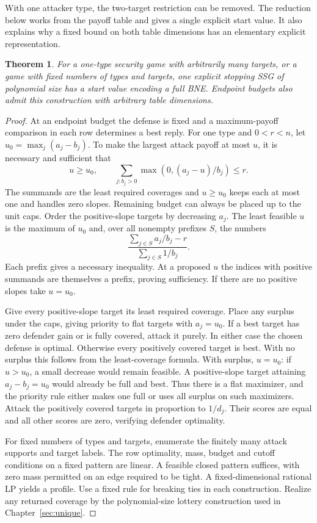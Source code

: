 \documentclass[11pt,oneside,openany,notitlepage]{report}
\newtheorem{theorem}{Theorem}[chapter]
\begin{document}
With one attacker type, the two-target restriction can be removed.
The reduction below works from the payoff table and gives a single
explicit start value. It also explains why a fixed bound on both table
dimensions has an elementary explicit representation.

\begin{theorem}\label{thm:ssgsmall}
For a one-type security game with arbitrarily many targets, or a game
with fixed numbers of types and targets, one explicit stopping SSG of
polynomial size has a start value encoding a full BNE. Endpoint budgets
also admit this construction with arbitrary table dimensions.
\end{theorem}
\begin{proof}
At an endpoint budget the defense is fixed and a maximum-payoff
comparison in each row determines a best reply. For one type and
\(0<r<n\), let \(u_0=\max_j(a_j-b_j)\). To make the largest attack
payoff at most \(u\), it is necessary and sufficient that
\[
 u\ge u_0,\qquad
 \sum_{j:b_j>0}\max(0,(a_j-u)/b_j)\le r .
\]
The summands are the least required coverages and \(u\ge u_0\) keeps
each at most one and handles zero slopes. Remaining budget can always
be placed up to the unit caps. Order the positive-slope targets by
decreasing \(a_j\). The least feasible \(u\) is the maximum of \(u_0\)
and, over all nonempty prefixes \(S\), the numbers
\[
 \frac{\sum_{j\in S} a_j/b_j-r}{\sum_{j\in S}1/b_j}.
\]
Each prefix gives a necessary inequality. At a proposed \(u\) the
indices with positive summands are themselves a prefix, proving
sufficiency. If there are no positive slopes take \(u=u_0\).

Give every positive-slope target its least required coverage. Place
any surplus under the caps, giving priority to flat targets with
\(a_j=u_0\). If a best target has zero defender gain or is fully covered,
attack it purely. In either case the chosen defense is optimal.
Otherwise every positively covered target is best. With no surplus
this follows from the least-coverage formula. With surplus, \(u=u_0\):
if \(u>u_0\), a small decrease would remain feasible. A positive-slope
target attaining \(a_j-b_j=u_0\) would already be full and best.
Thus there is a flat maximizer, and the priority rule either makes one
full or uses all surplus on such maximizers. Attack the positively
covered targets in proportion to \(1/d_j\). Their scores are equal
and all other scores are zero, verifying defender optimality.

For fixed numbers of types and targets, enumerate the finitely many
attack supports and target labels. The row optimality, mass, budget and
cutoff conditions on a fixed pattern are linear. A feasible closed
pattern suffices, with zero mass permitted on an edge required to be
tight. A fixed-dimensional rational LP yields a profile. Use a fixed
rule for breaking ties in each construction. Realize any returned
coverage by the polynomial-size lottery construction used in
Chapter~\ref{sec:unique}.


\end{proof}
\end{document}
